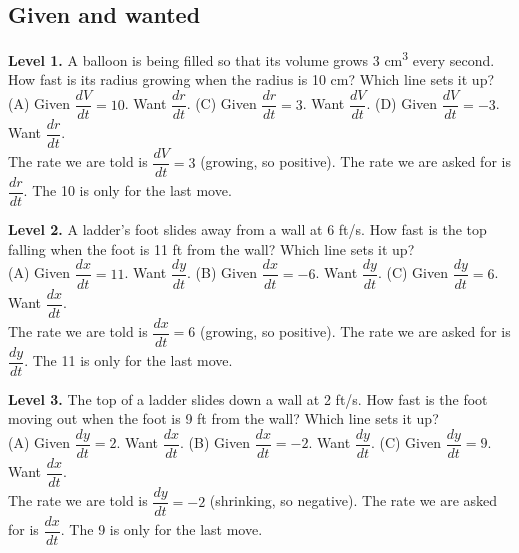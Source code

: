 \documentclass[11pt]{article}
\begin{document}
\subsection*{Given and wanted}
\noindent\textbf{Level 1.} A balloon is being filled so that its volume grows 3 cm\textsuperscript{3} every second. How fast is its radius growing when the radius is 10 cm? Which line sets it up?\\ (A) Given $\dfrac{dV}{dt}=10$. Want $\dfrac{dr}{dt}$. \quad {} \quad (C) Given $\dfrac{dr}{dt}=3$. Want $\dfrac{dV}{dt}$. \quad (D) Given $\dfrac{dV}{dt}=-3$. Want $\dfrac{dr}{dt}$.\\  \quad The rate we are told is $\dfrac{dV}{dt}=3$ (growing, so positive). The rate we are asked for is $\dfrac{dr}{dt}$. The 10 is only for the last move.\par\medskip
\noindent\textbf{Level 2.} A ladder's foot slides away from a wall at 6 ft/s. How fast is the top falling when the foot is 11 ft from the wall? Which line sets it up?\\ (A) Given $\dfrac{dx}{dt}=11$. Want $\dfrac{dy}{dt}$. \quad (B) Given $\dfrac{dx}{dt}=-6$. Want $\dfrac{dy}{dt}$. \quad (C) Given $\dfrac{dy}{dt}=6$. Want $\dfrac{dx}{dt}$. \quad {}\\  \quad The rate we are told is $\dfrac{dx}{dt}=6$ (growing, so positive). The rate we are asked for is $\dfrac{dy}{dt}$. The 11 is only for the last move.\par\medskip
\noindent\textbf{Level 3.} The top of a ladder slides down a wall at 2 ft/s. How fast is the foot moving out when the foot is 9 ft from the wall? Which line sets it up?\\ (A) Given $\dfrac{dy}{dt}=2$. Want $\dfrac{dx}{dt}$. \quad (B) Given $\dfrac{dx}{dt}=-2$. Want $\dfrac{dy}{dt}$. \quad (C) Given $\dfrac{dy}{dt}=9$. Want $\dfrac{dx}{dt}$. \quad {}\\  \quad The rate we are told is $\dfrac{dy}{dt}=-2$ (shrinking, so negative). The rate we are asked for is $\dfrac{dx}{dt}$. The 9 is only for the last move.\par\medskip
\end{document}
